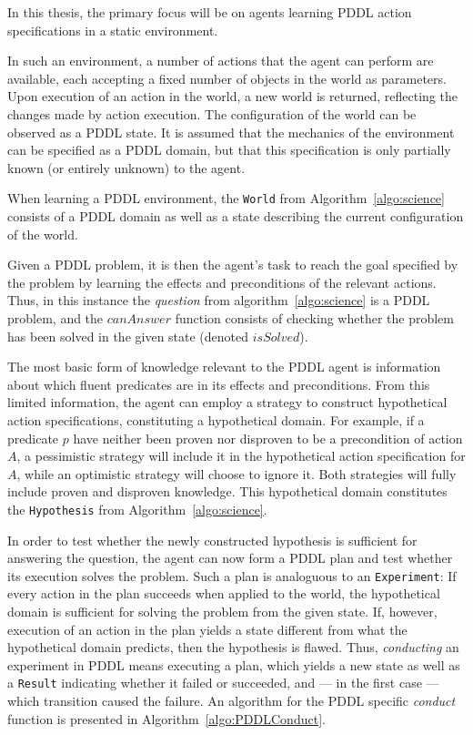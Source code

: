 \documentclass[../Master.tex]{subfiles}
\begin{document}
In this thesis, the primary focus will be on agents learning PDDL action specifications in a static environment.

In such an environment, a number of actions that the agent can perform are available, each accepting a fixed number of objects in the world as parameters. Upon execution of an action in the world, a new world is returned, reflecting the changes made by action execution. The configuration of the world can be observed as a PDDL state. It is assumed that the mechanics of the environment can be specified as a PDDL domain, but that this specification is only partially known (or entirely unknown) to the agent. 

When learning a PDDL environment, the \texttt{World} from Algorithm~\ref{algo:science} consists of a PDDL domain as well as a state describing the current configuration of the world.

Given a PDDL problem, it is then the agent's task to reach the goal specified by the problem by learning the effects and preconditions of the relevant actions. Thus, in this instance the \textit{question} from algorithm~\ref{algo:science} is a PDDL problem, and the $canAnswer$ function consists of checking whether the problem has been solved in the given state (denoted $isSolved$).

The most basic form of knowledge relevant to the PDDL agent is information about which fluent predicates are in its effects and preconditions. From this limited information, the agent can employ a strategy to construct hypothetical action specifications, constituting a hypothetical domain. For example, if a predicate $p$ have neither been proven nor disproven to be a precondition of action $A$, a pessimistic strategy will include it in the hypothetical action specification for $A$, while an optimistic strategy will choose to ignore it. Both strategies will fully include proven and disproven knowledge. This hypothetical domain constitutes the \texttt{Hypothesis} from Algorithm~\ref{algo:science}.

In order to test whether the newly constructed hypothesis is sufficient for answering the question, the agent can now form a PDDL plan and test whether its execution solves the problem. Such a plan is analoguous to an \texttt{Experiment}: If every action in the plan succeeds when applied to the world, the hypothetical domain is sufficient for solving the problem from the given state. If, however, execution of an action in the plan yields a state different from what the hypothetical domain predicts, then the hypothesis is flawed. Thus, \emph{conducting} an experiment in PDDL means executing a plan, which yields a new state as well as a \texttt{Result} indicating whether it failed or succeeded, and --- in the first case --- which transition caused the failure. An algorithm for the PDDL specific \textit{conduct} function is presented in Algorithm~\ref{algo:PDDLConduct}. 
\end{document}
